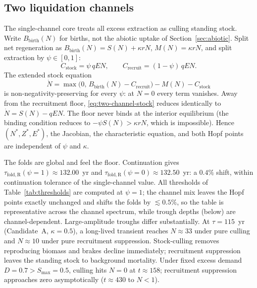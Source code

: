 \documentclass[11pt]{article}
\theoremstyle{definition}
\begin{document}
\subsection{Two liquidation channels}
\label{sec:two-channel}

The single-channel core treats all excess extraction as culling standing stock. Write $B_{\mathrm{birth}}(N)$ for births, not the abiotic uptake of Section~\ref{sec:abiotic}. Split net regeneration as $B_{\mathrm{birth}}(N)=S(N)+\kappa r N$, $M(N)=\kappa r N$, and split extraction by $\psi\in[0,1]$:
\[
C_{\mathrm{stock}}=\psi\,qEN,\qquad C_{\mathrm{recruit}}=(1-\psi)\,qEN.
\]
The extended stock equation
\begin{equation}
\dot N=\max\bigl(0,\,B_{\mathrm{birth}}(N)-C_{\mathrm{recruit}}\bigr)-M(N)-C_{\mathrm{stock}}
\label{eq:two-channel-stock}
\end{equation}
is non-negativity-preserving for every $\psi$: at $N=0$ every term vanishes. Away from the recruitment floor, \eqref{eq:two-channel-stock} reduces identically to $\dot N=S(N)-qEN$. The floor never binds at the interior equilibrium (the binding condition reduces to $-\psi S(N)>\kappa r N$, which is impossible). Hence $(N^*,Z^*,E^*)$, the Jacobian, the characteristic equation, and both Hopf points are independent of $\psi$ and $\kappa$.

The folds are global and feel the floor. Continuation gives $\tau_{\mathrm{fold,R}}(\psi{=}1)\approx 132.00$~yr and $\tau_{\mathrm{fold,R}}(\psi{=}0)\approx 132.50$~yr: a $0.4\%$ shift, within continuation tolerance of the single-channel value. All thresholds of Table~\ref{tab:thresholds} are computed at $\psi=1$; the channel mix leaves the Hopf points exactly unchanged and shifts the folds by $\lesssim0.5\%$, so the table is representative across the channel spectrum, while trough depths (below) are channel-dependent. Large-amplitude troughs differ substantially. At $\tau=115$~yr (Candidate~A, $\kappa=0.5$), a long-lived transient reaches $N\approx 33$ under pure culling and $N\approx 10$ under pure recruitment suppression. Stock-culling removes reproducing biomass and brakes decline immediately; recruitment suppression leaves the standing stock to background mortality. Under fixed excess demand $D=0.7>S_{\max}=0.5$, culling hits $N=0$ at $t\approx 158$; recruitment suppression approaches zero asymptotically ($t\approx 430$ to $N<1$).
\end{document}
